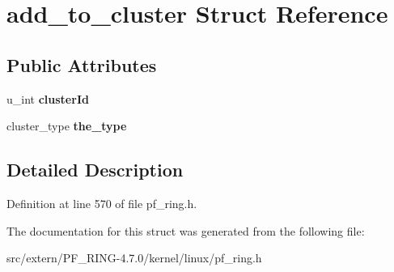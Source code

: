 \hypertarget{structadd__to__cluster}{
\section{add\_\-to\_\-cluster Struct Reference}
\label{structadd__to__cluster}
}
\subsection*{Public Attributes}
\begin{DoxyCompactItemize}
\item 
\hypertarget{structadd__to__cluster_a491de5a5338020d1979db2e24b1e61d7}{
u\_\-int {\bfseries clusterId}}
\label{structadd__to__cluster_a491de5a5338020d1979db2e24b1e61d7}

\item 
\hypertarget{structadd__to__cluster_a283203541c7693aa18b136be8d99344c}{
cluster\_\-type {\bfseries the\_\-type}}
\label{structadd__to__cluster_a283203541c7693aa18b136be8d99344c}

\end{DoxyCompactItemize}


\subsection{Detailed Description}


Definition at line 570 of file pf\_\-ring.h.



The documentation for this struct was generated from the following file:\begin{DoxyCompactItemize}
\item 
src/extern/PF\_\-RING-\/4.7.0/kernel/linux/pf\_\-ring.h\end{DoxyCompactItemize}
